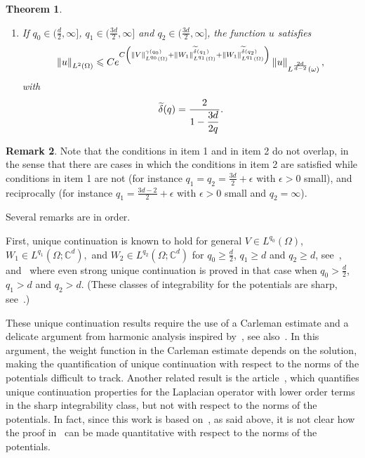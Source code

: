 \documentclass[10pt]{amsart}
\newtheorem{theo}{Theorem}[section]
\theoremstyle{definition}\newtheorem{defi}[theo]{Definition}\newtheorem{rema}[theo]{Remark}\newtheorem{exam}[theo]{Example}\newtheorem{exem}[theo]{Example}\newtheorem{nota}[theo]{Notation}
\newcommand*\C{\mathbb{C}}
\newcommand*\ds{\displaystyle}
\newcommand{\norm}[1]{\left\Vert#1\right\Vert}
\renewcommand{\geq}{\geqslant}
\renewcommand{\tilde}{\widetilde}
\let\oldtilde\tilde
\renewcommand*{\tilde}[1]{\mathchoice{\widetilde{#1}}{\widetilde{#1}}{\oldtilde{#1}}{\oldtilde{#1}}}
\begin{document}
\begin{theo}
\begin{enumerate}
\item\label{theo1.3.2} If $q_0 \in (\frac{d}{2}, \infty]$, $q_1 \in (\frac{3d}{2}, \infty]$ and $q_2\in (\frac{3d}{2}, \infty]$, the function $u$ satisfies
\begin{equation}\label{Quantitative}
\norm{u }_{L^2(\Omega)} \leqslant C e^{ C \left(\norm{V}_{L^{q_0}(\Omega)}^{\gamma(q_0)}+\norm{W_1}_{L^{q_1}(\Omega)}^{\tilde\delta(q_1)} + \norm{W_1}_{L^{q_1}(\Omega)}^{\tilde\delta(q_2)}
\right) }\norm{u}_{L^{\frac{2d}{d-2}}(\omega)},
\end{equation}
with
\begin{equation*}
\tilde \delta(q) = \frac{2}{\ds 1 - \frac{3d}{2q}}.
\end{equation*}
\end{enumerate}
\end{theo}

\begin{rema}
Note that the conditions in item 1 and in item 2 do not overlap, in the sense that there are cases in which the conditions in item 2 are satisfied while conditions in item 1 are not (for instance $q_1 = q_2 = \frac{3d}{2} + \epsilon$ with $\epsilon >0$ small), and reciprocally (for instance $q_1 = \frac{3d-2}{2} + \epsilon$ with $\epsilon>0$ small and $q_2 = \infty$).
\end{rema}

Several remarks are in order.

First, unique continuation is known to hold for general $ V\in L^{q_0}(\Omega)$, $W_1 \in L^{q_1}(\Omega; \C^d),$ and $W_2 \in L^{q_2}(\Omega; \C^d)$ for $q_0 \geq \frac{d}{2}$, $q_1\geq d$ and $q_2 \geq d$, see~\cite{Wolff-1993}, and~\cite{koch2001carleman} where even strong unique continuation is proved in that case when $q_0 > \frac{d}{2}$, $q_1 > d$ and $q_2 > d$. (These classes of integrability for the potentials are sharp, see~\cite{koch2002sharp}.)

These unique continuation results require the use of a Carleman estimate and a delicate argument from harmonic analysis inspired by~\cite{wolff1992property}, see also~\cite{koch2001carleman}. In this argument, the weight function in the Carleman estimate depends on the solution, making the quantification of unique continuation with respect to the norms of the potentials difficult to track. Another related result is the article~\cite{malinnikova2012quantitative}, which quantifies unique continuation properties for the Laplacian operator with lower order terms in the sharp integrability class, but not with respect to the norms of the potentials. In fact, since this work is based on~\cite{koch2001carleman}, as said above, it is not clear how the proof in~\cite{malinnikova2012quantitative} can be made quantitative with respect to the norms of the potentials.
\end{document}
